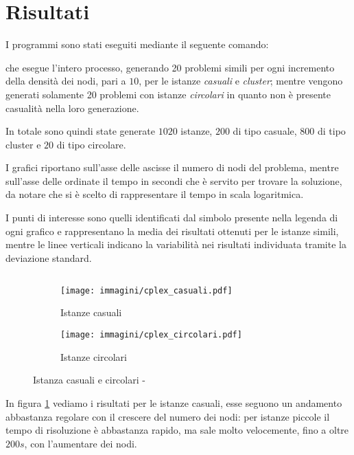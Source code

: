 \section{Risultati}
\label{sec:risultati}
I programmi sono stati eseguiti mediante il seguente comando:
\begin{quotation}
\end{quotation}
che esegue l'intero processo, generando 20 problemi simili per ogni incremento della densità dei nodi, pari a $10$, per le istanze \emph{casuali} e \emph{cluster}; mentre vengono generati solamente 20 problemi con istanze \emph{circolari} in quanto non è presente casualità nella loro generazione.

In totale sono quindi state generate $1020$ istanze, $200$ di tipo casuale, $800$ di tipo cluster e $20$ di tipo circolare.

I grafici riportano sull'asse delle ascisse il numero di nodi del problema, mentre sull'asse delle ordinate il tempo in secondi che è servito per trovare la soluzione, da notare che si è scelto di rappresentare il tempo in scala logaritmica.

I punti di interesse sono quelli identificati dal simbolo presente nella legenda di ogni grafico e rappresentano la media dei risultati ottenuti per le istanze simili, mentre le linee verticali indicano la variabilità nei risultati individuata tramite la deviazione standard.

\subsection{}
\begin{figure}[htb]
	\centering
	\begin{subfigure}[b]{.45\textwidth}
		\texttt{[image: immagini/cplex\_casuali.pdf]}
		\caption{Istanze casuali}
		\label{fig:casuali cplex}
	\end{subfigure}
	\quad
	\begin{subfigure}[b]{.45\textwidth}
		\texttt{[image: immagini/cplex\_circolari.pdf]}
		\caption{Istanze circolari}
		\label{fig:circolari cplex}
	\end{subfigure}
	\caption{Istanza casuali e circolari - }
	\label{fig:casuali circolari cplex}
\end{figure}

In figura \ref{fig:casuali cplex} vediamo i risultati per le istanze casuali, esse seguono un andamento abbastanza regolare con il crescere del numero dei nodi: per istanze piccole il tempo di risoluzione è abbastanza rapido, ma sale molto velocemente, fino a oltre $200s$, con l'aumentare dei nodi.

